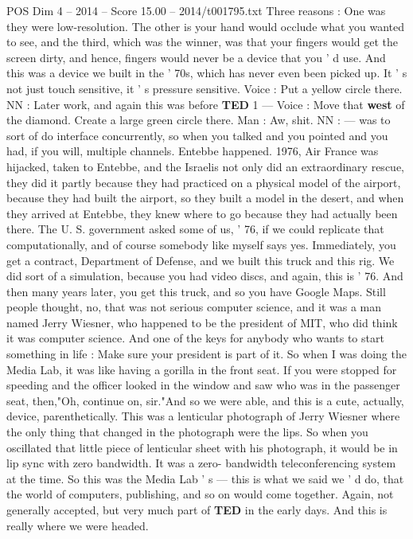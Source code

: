 \begin{textsample}{POS Dim 4 – 2014 – Score 15.00 – 2014/t001795.txt}
Three reasons : One was they were low-resolution.
The other is your hand would occlude what you wanted to see, and the third, which was the winner, was that your fingers would get the screen dirty, and hence, fingers would never be a device that you ' d use.
And this was a device we built in the ' 70s, which has never even been picked up.
It ' s not just touch sensitive, it ' s pressure sensitive.
Voice : Put a yellow circle there.
NN : Later work, and again this was before \textbf{TED} 1 — Voice : Move that \textbf{west} of the diamond.
Create a large green circle there.
Man : Aw, shit.
NN : — was to sort of do interface concurrently, so when you talked and you pointed and you had, if you will, multiple channels.
Entebbe happened. 1976, Air France was hijacked, taken to Entebbe, and the Israelis not only did an extraordinary rescue, they did it partly because they had practiced on a physical model of the airport, because they had built the airport, so they built a model in the desert, and when they arrived at Entebbe, they knew where to go because they had actually been there.
The U.
S. government asked some of us, ' 76, if we could replicate that computationally, and of course somebody like myself says yes.
Immediately, you get a contract, Department of Defense, and we built this truck and this rig.
We did sort of a simulation, because you had video discs, and again, this is ' 76.
And then many years later, you get this truck, and so you have Google Maps.
Still people thought, no, that was not serious computer science, and it was a man named Jerry Wiesner, who happened to be the president of MIT, who did think it was computer science.
And one of the keys for anybody who wants to start something in life : Make sure your president is part of it.
So when I was doing the Media Lab, it was like having a gorilla in the front seat.
If you were stopped for speeding and the officer looked in the window and saw who was in the passenger seat, then,"Oh, continue on, sir."And so we were able, and this is a cute, actually, device, parenthetically.
This was a lenticular photograph of Jerry Wiesner where the only thing that changed in the photograph were the lips.
So when you oscillated that little piece of lenticular sheet with his photograph, it would be in lip sync with zero bandwidth.
It was a zero- bandwidth teleconferencing system at the time.
So this was the Media Lab ' s — this is what we said we ' d do, that the world of computers, publishing, and so on would come together.
Again, not generally accepted, but very much part of \textbf{TED} in the early days.
And this is really where we were headed.

\end{textsample}
